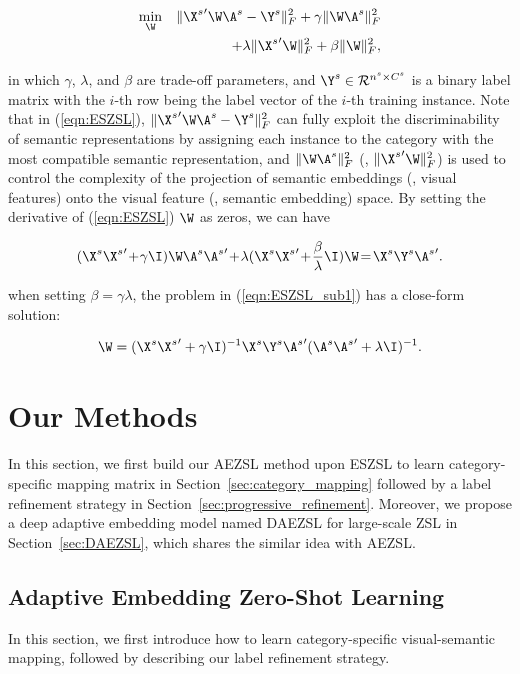 \documentclass[journal]{IEEEtran}
\begin{document}
\vspace{-15pt}
\begin{eqnarray} \label{eqn:ESZSL}
\min_{\W}&&\|{\X^s}'\W\A^s-\Y^s\|_F^2 + \gamma \|\W\A^s\|_F^2 \\
&&+\lambda \|{\X^s}'\W\|_F^2+\beta\|\W\|_F^2,
\end{eqnarray}

\noindent in which $\gamma$, $\lambda$, and $\beta$ are trade-off parameters, and $\Y^s\in\mathcal{R}^{n^s\times C^s}$ is a binary label matrix with the $i$-th row being the label vector of the $i$-th training instance. Note that in (\ref{eqn:ESZSL}),
$\|{\X^s}'\W\A^s-\Y^s\|_F^2$ can fully exploit the discriminability of semantic representations by assigning each instance to the category with the most compatible semantic representation, and $\|\W\A^s\|_F^2$ (\resp, $\|{\X^s}'\W\|_F^2$) is used to control the complexity of the projection of semantic embeddings (\resp, visual features) onto the visual feature (\resp, semantic embedding) space. By setting the derivative of (\ref{eqn:ESZSL}) \wrt $\W$ as zeros, we can have

\vspace{-15pt}
\begin{eqnarray} \label{eqn:ESZSL_sub1}
(\X^s{\X^s}'\!+\!\gamma\I)\W\A^s{\A^s}'\!+\! \lambda(\X^s{\X^s}'\!+\!\frac{\beta}{\lambda}\I)\W\!=\!\X^s\Y^s{\A^s}'.
\end{eqnarray}

\noindent when setting $\beta=\gamma\lambda$, the problem in (\ref{eqn:ESZSL_sub1}) has a close-form solution:

\vspace{-15pt}
\begin{eqnarray} \W=(\X^s{\X^s}'+\gamma\I)^{-1}\X^s\Y^s{\A^s}'
(\A^s{\A^s}'+\lambda\I)^{-1}.
\end{eqnarray}

\section{Our Methods} \label{sec:ours}
In this section, we first build our AEZSL method upon ESZSL to learn category-specific mapping matrix in Section~\ref{sec:category_mapping} followed by a label refinement strategy in Section~\ref{sec:progressive_refinement}. Moreover, we propose a deep adaptive embedding model named DAEZSL for large-scale ZSL in Section~\ref{sec:DAEZSL}, which shares the similar idea with AEZSL.

\subsection{Adaptive Embedding Zero-Shot Learning}
In this section, we first introduce how to learn category-specific visual-semantic mapping, followed by describing our label refinement strategy.
\end{document}
